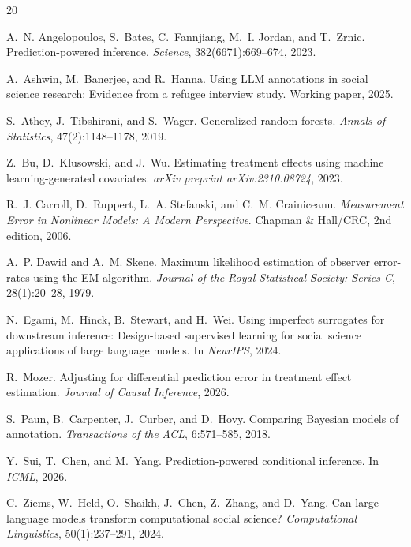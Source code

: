 \documentclass[11pt,a4paper]{article}
\begin{document}

\begin{thebibliography}{20}

A.~N. Angelopoulos, S.~Bates, C.~Fannjiang, M.~I. Jordan, and T.~Zrnic.
\newblock Prediction-powered inference.
\newblock \emph{Science}, 382(6671):669--674, 2023.

A.~Ashwin, M.~Banerjee, and R.~Hanna.
\newblock Using {LLM} annotations in social science research: Evidence from a refugee interview study.
\newblock Working paper, 2025.

S.~Athey, J.~Tibshirani, and S.~Wager.
\newblock Generalized random forests.
\newblock \emph{Annals of Statistics}, 47(2):1148--1178, 2019.

Z.~Bu, D.~Klusowski, and J.~Wu.
\newblock Estimating treatment effects using machine learning-generated covariates.
\newblock \emph{arXiv preprint arXiv:2310.08724}, 2023.

R.~J. Carroll, D.~Ruppert, L.~A. Stefanski, and C.~M. Crainiceanu.
\newblock \emph{Measurement Error in Nonlinear Models: A Modern Perspective}.
\newblock Chapman \& Hall/CRC, 2nd edition, 2006.

A.~P. Dawid and A.~M. Skene.
\newblock Maximum likelihood estimation of observer error-rates using the {EM} algorithm.
\newblock \emph{Journal of the Royal Statistical Society: Series C}, 28(1):20--28, 1979.

N.~Egami, M.~Hinck, B.~Stewart, and H.~Wei.
\newblock Using imperfect surrogates for downstream inference: Design-based supervised learning for social science applications of large language models.
\newblock In \emph{NeurIPS}, 2024.

R.~Mozer.
\newblock Adjusting for differential prediction error in treatment effect estimation.
\newblock \emph{Journal of Causal Inference}, 2026.

S.~Paun, B.~Carpenter, J.~Curber, and D.~Hovy.
\newblock Comparing {B}ayesian models of annotation.
\newblock \emph{Transactions of the ACL}, 6:571--585, 2018.

Y.~Sui, T.~Chen, and M.~Yang.
\newblock Prediction-powered conditional inference.
\newblock In \emph{ICML}, 2026.

C.~Ziems, W.~Held, O.~Shaikh, J.~Chen, Z.~Zhang, and D.~Yang.
\newblock Can large language models transform computational social science?
\newblock \emph{Computational Linguistics}, 50(1):237--291, 2024.

\end{thebibliography}
\end{document}
